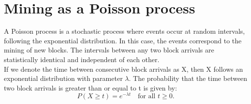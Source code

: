 \section{Mining as a Poisson process}
A Poisson process is a stochastic process where events occur at random intervals, following the exponential distribution. In this case, the events correspond to the mining of new blocks. The intervals between any two block arrivals are statistically identical and independent of each other.\\
If we denote the time between consecutive block arrivals as X, then X follows an exponential distribution with parameter $\lambda$. The probability that the time between two block arrivals is greater than or equal to t is given by:\\
$$ P(X \geq t) = e^{-\lambda t} \quad \text{for all } t \geq 0. $$

